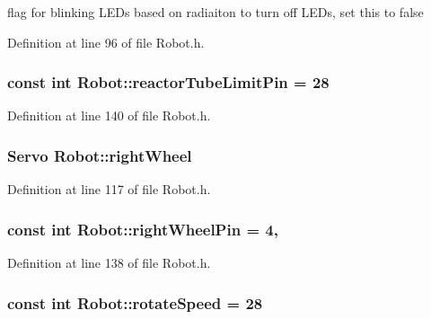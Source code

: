 flag for blinking L\-E\-Ds based on radiaiton to turn off L\-E\-Ds, set this to false 



Definition at line 96 of file Robot.\-h.

\hypertarget{classRobot_a351d754436c8f569432ef7a06641f98a}{
\subsubsection[{reactor\-Tube\-Limit\-Pin}]{\setlength{\rightskip}{0pt plus 5cm}const int Robot\-::reactor\-Tube\-Limit\-Pin = 28\hspace{0.3cm}{\ttfamily [private]}}}\label{classRobot_a351d754436c8f569432ef7a06641f98a}


Definition at line 140 of file Robot.\-h.

\hypertarget{classRobot_a3b2dd5b89e44fd3a7ba239554fb5b8a7}{
\subsubsection[{right\-Wheel}]{\setlength{\rightskip}{0pt plus 5cm}Servo Robot\-::right\-Wheel\hspace{0.3cm}{\ttfamily [private]}}}\label{classRobot_a3b2dd5b89e44fd3a7ba239554fb5b8a7}


Definition at line 117 of file Robot.\-h.

\hypertarget{classRobot_a572525b971da4e0f272f5f1259f6c84f}{
\subsubsection[{right\-Wheel\-Pin}]{\setlength{\rightskip}{0pt plus 5cm}const int Robot\-::right\-Wheel\-Pin = 4\hspace{0.3cm}{\ttfamily [static]}, {\ttfamily [private]}}}\label{classRobot_a572525b971da4e0f272f5f1259f6c84f}


Definition at line 138 of file Robot.\-h.

\hypertarget{classRobot_a4063d601b5b4d5aad332f617abb36c7b}{
\subsubsection[{rotate\-Speed}]{\setlength{\rightskip}{0pt plus 5cm}const int Robot\-::rotate\-Speed = 28\hspace{0.3cm}{\ttfamily [private]}}}\label{classRobot_a4063d601b5b4d5aad332f617abb36c7b}


